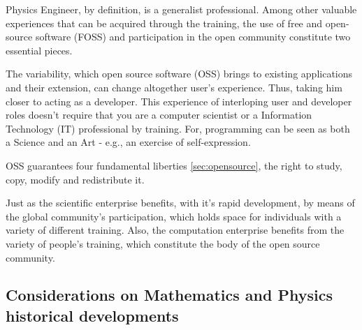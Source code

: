 \documentclass[
12pt,				%
openright,			%
oneside,			%
a4paper,			%
brazil,				%
english,			%
]{abntex2}
\begin{document}
Physics Engineer, by definition, is a generalist professional.
Among other valuable experiences that can be acquired through the
training, the use of free and open-source software (FOSS) and
participation in the open community constitute two essential pieces.


The variability, which open source software (OSS) brings to existing
applications and their extension, can change altogether user's experience. Thus, taking him closer to acting as a developer. This experience of interloping user and developer roles doesn't require that you are a computer scientist or a Information Technology (IT) professional by training. For, programming can be seen as both a Science and an Art \cite{knuth1968art} - e.g., an exercise of self-expression.

OSS guarantees four fundamental liberties \autoref{sec:opensource}, the right to study, copy, modify and redistribute it.

Just as the scientific enterprise benefits, with it's rapid development, by means of the global community's participation, which holds space for individuals with a variety of different training. Also, the computation enterprise benefits from the variety of people's training, which constitute the body of the open source community.

\subsection{Considerations on Mathematics and Physics historical developments}
\end{document}
